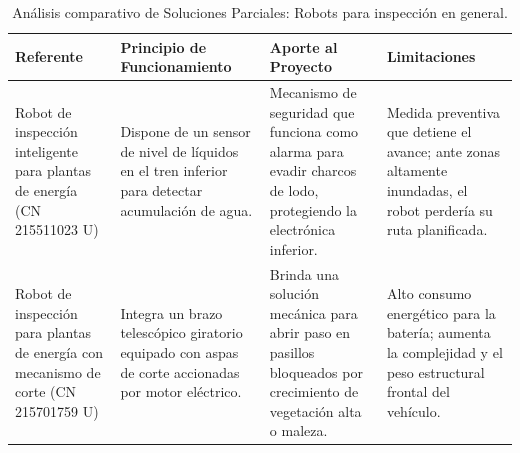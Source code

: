\documentclass[../../General.tex]{subfiles}
\begin{document}
\begin{table}[H]
	\centering
	\footnotesize
	\caption{Análisis comparativo de Soluciones Parciales: Robots para inspección en general.}
	\label{tab:estado_arte_robots_general}
	\begin{tabularx}{\textwidth}{|p{3.5cm}|>{\raggedright\arraybackslash}X|>{\raggedright\arraybackslash}X|>{\raggedright\arraybackslash}X|}
		\hline
		\rowcolor[HTML]{D9E1F2} 
		\textbf{Referente} & \textbf{Principio de Funcionamiento} & \textbf{Aporte al Proyecto} & \textbf{Limitaciones} \\ \hline
		Robot de inspección inteligente para plantas de energía (CN 215511023 U) & Dispone de un sensor de nivel de líquidos en el tren inferior para detectar acumulación de agua. & Mecanismo de seguridad que funciona como alarma para evadir charcos de lodo, protegiendo la electrónica inferior. & Medida preventiva que detiene el avance; ante zonas altamente inundadas, el robot perdería su ruta planificada. \\ \hline
		Robot de inspección para plantas de energía con mecanismo de corte (CN 215701759 U) & Integra un brazo telescópico giratorio equipado con aspas de corte accionadas por motor eléctrico. & Brinda una solución mecánica para abrir paso en pasillos bloqueados por crecimiento de vegetación alta o maleza. & Alto consumo energético para la batería; aumenta la complejidad y el peso estructural frontal del vehículo. \\ \hline
	\end{tabularx}
\end{table}
\end{document}
